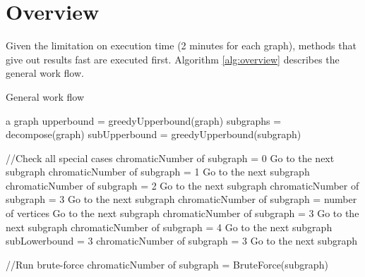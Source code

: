 \documentclass[a4paper]{report}
\begin{document}
	\section{Overview}
	Given the limitation on execution time (2 minutes for each graph), methods that give out results fast are executed first. Algorithm \ref{alg:overview} describes the general work flow.\\
	\begin{algorithm}
		\caption{General work flow}
		\label{alg:overview}
		\begin{algorithmic}[1]
			\REQUIRE a graph
			\STATE upperbound = greedyUpperbound(graph)
			\STATE subgraphs = decompose(graph)
				\STATE subUpperbound =  greedyUpperbound(subgraph)
				
				\STATE//Check all special cases
					\STATE chromaticNumber of subgraph = 0
					\STATE Go to the next subgraph
				\ENDIF
				\STATE chromaticNumber of subgraph = 1
				\STATE Go to the next subgraph
				\ENDIF
				\STATE chromaticNumber of subgraph = 2
				\STATE Go to the next subgraph
				\ENDIF
				\STATE chromaticNumber of subgraph = 3
				\STATE Go to the next subgraph
				\ENDIF
				\STATE chromaticNumber of subgraph = number of vertices
				\STATE Go to the next subgraph
				\ENDIF
					\STATE chromaticNumber of subgraph = 3
					\STATE Go to the next subgraph
					\ELSE
					\STATE chromaticNumber of subgraph = 4
					\STATE Go to the next subgraph
					\ENDIF
				\ENDIF
				\STATE subLowerbound = 3
				\STATE chromaticNumber of subgraph = 3
				\STATE Go to the next subgraph
				\ENDIF
				
				\STATE//Run brute-force
				\STATE chromaticNumber of subgraph = BruteForce(subgraph)
				\ENDIF 
			\ENDFOR

			\end{algorithmic}
		\end{algorithm}
\end{document}
